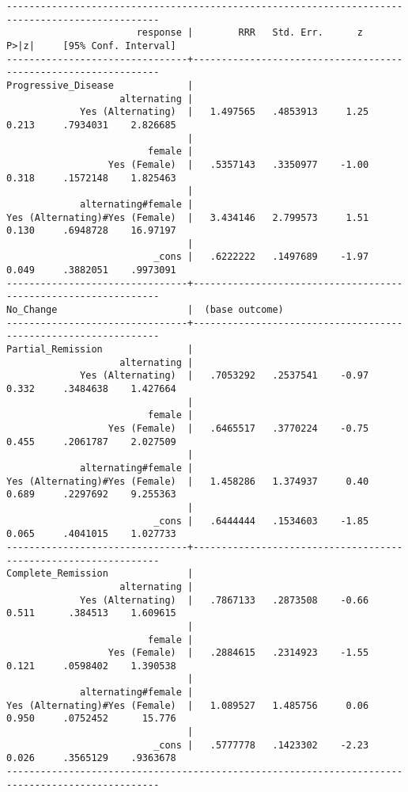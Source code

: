 \documentclass{article}
\begin{document}
\begin{enumerate}[c.]
\begin{verbatim}
-------------------------------------------------------------------------------------------------
                       response |        RRR   Std. Err.      z    P>|z|     [95% Conf. Interval]
--------------------------------+----------------------------------------------------------------
Progressive_Disease             |
                    alternating |
             Yes (Alternating)  |   1.497565   .4853913     1.25   0.213     .7934031    2.826685
                                |
                         female |
                  Yes (Female)  |   .5357143   .3350977    -1.00   0.318     .1572148    1.825463
                                |
             alternating#female |
Yes (Alternating)#Yes (Female)  |   3.434146   2.799573     1.51   0.130     .6948728    16.97197
                                |
                          _cons |   .6222222   .1497689    -1.97   0.049     .3882051    .9973091
--------------------------------+----------------------------------------------------------------
No_Change                       |  (base outcome)
--------------------------------+----------------------------------------------------------------
Partial_Remission               |
                    alternating |
             Yes (Alternating)  |   .7053292   .2537541    -0.97   0.332     .3484638    1.427664
                                |
                         female |
                  Yes (Female)  |   .6465517   .3770224    -0.75   0.455     .2061787    2.027509
                                |
             alternating#female |
Yes (Alternating)#Yes (Female)  |   1.458286   1.374937     0.40   0.689     .2297692    9.255363
                                |
                          _cons |   .6444444   .1534603    -1.85   0.065     .4041015    1.027733
--------------------------------+----------------------------------------------------------------
Complete_Remission              |
                    alternating |
             Yes (Alternating)  |   .7867133   .2873508    -0.66   0.511      .384513    1.609615
                                |
                         female |
                  Yes (Female)  |   .2884615   .2314923    -1.55   0.121     .0598402    1.390538
                                |
             alternating#female |
Yes (Alternating)#Yes (Female)  |   1.089527   1.485756     0.06   0.950     .0752452      15.776
                                |
                          _cons |   .5777778   .1423302    -2.23   0.026     .3565129    .9363678
-------------------------------------------------------------------------------------------------


\end{verbatim}
\end{enumerate}
\end{document}
